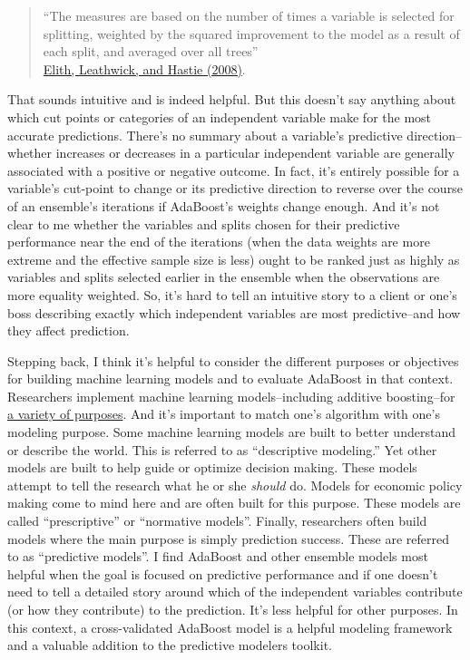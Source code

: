 \documentclass[]{tufte-handout}
\begin{document}
\begin{quote}
``The measures are based on the number of times a variable is selected
for splitting, weighted by the squared improvement to the model as a
result of each split, and averaged over all trees''\\
\href{http://onlinelibrary.wiley.com/doi/10.1111/j.1365-2656.2008.01390.x/full}{Elith,
Leathwick, and Hastie (2008)}.
\end{quote}

That sounds intuitive and is indeed helpful. But this doesn't say
anything about which cut points or categories of an independent variable
make for the most accurate predictions. There's no summary about a
variable's predictive direction--whether increases or decreases in a
particular independent variable are generally associated with a positive
or negative outcome. In fact, it's entirely possible for a variable's
cut-point to change or its predictive direction to reverse over the
course of an ensemble's iterations if AdaBoost's weights change enough.
And it's not clear to me whether the variables and splits chosen for
their predictive performance near the end of the iterations (when the
data weights are more extreme and the effective sample size is less)
ought to be ranked just as highly as variables and splits selected
earlier in the ensemble when the observations are more equality
weighted. So, it's hard to tell an intuitive story to a client or one's
boss describing exactly which independent variables are most
predictive--and how they affect prediction.

Stepping back, I think it's helpful to consider the different purposes
or objectives for building machine learning models and to evaluate
AdaBoost in that context. Researchers implement machine learning
models--including additive boosting--for
\href{https://www.dezyre.com/article/types-of-analytics-descriptive-predictive-prescriptive-analytics/209}{a
variety of purposes}. And it's important to match one's algorithm with
one's modeling purpose. Some machine learning models are built to better
understand or describe the world. This is referred to as ``descriptive
modeling.'' Yet other models are built to help guide or optimize
decision making. These models attempt to tell the research what he or
she \emph{should} do. Models for economic policy making come to mind
here and are often built for this purpose. These models are called
``prescriptive'' or ``normative models''. Finally, researchers often
build models where the main purpose is simply prediction success. These
are referred to as ``predictive models''. I find AdaBoost and other
ensemble models most helpful when the goal is focused on predictive
performance and if one doesn't need to tell a detailed story around
which of the independent variables contribute (or how they contribute)
to the prediction. It's less helpful for other purposes. In this
context, a cross-validated AdaBoost model is a helpful modeling
framework and a valuable addition to the predictive modelers toolkit.


\end{document}
